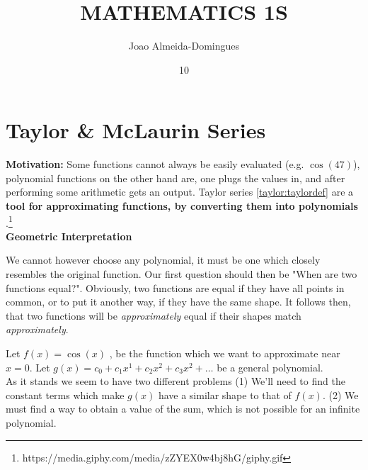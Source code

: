 \documentclass[english,course]{Notes}
\title{MATHEMATICS 1S}
\author{Joao Almeida-Domingues}
\date{10}{01}{2019}
\newcommand{\ita}[1]{\textit{#1}}
\begin{document}
\newpage

\section{Taylor \& McLaurin Series}

\textbf{Motivation:} Some functions cannot always be easily evaluated (e.g. $\cos(47)$), polynomial functions on the other hand are, one plugs the values in, and after performing some arithmetic  gets an output. Taylor series \ref{taylor:taylordef} are a \textbf{tool for approximating functions, by converting them into polynomials} .\footnote{https://media.giphy.com/media/zZYEX0w4bj8hG/giphy.gif} \\

\noindent\textbf{Geometric Interpretation}
\par{We cannot however choose any polynomial, it must be one which closely resembles the original function. Our first question should then be "When are two functions equal?". Obviously, two functions are equal if they have all points in common, or to put it another way, if they have the same shape. It follows then, that two functions will be \ita{approximately} equal if their shapes match \ita{approximately}.} \\

\par{ Let $f(x) = \cos(x)$ , be the function which we want to approximate near $x = 0$. Let $g(x) = c_0 + c_1x^1 + c_2x^2 + c_3x^2 + \dots $ be a general polynomial.} \\ As it stands we seem to have two different problems (1) We'll need to find the constant terms which make $g(x)$ have a similar shape to that of $f(x)$. (2) We must find a way to obtain a value of the sum, which is not possible for an infinite polynomial.
\end{document}
